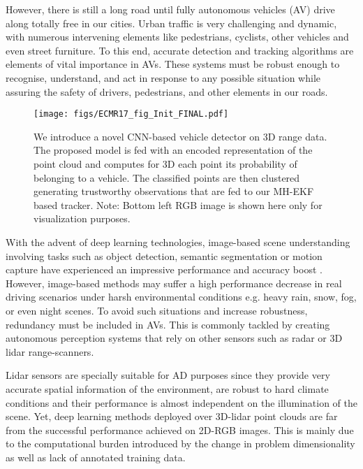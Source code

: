 \documentclass[letterpaper, 10 pt, conference]{ieeeconf}  %
\begin{document}
However, there is still a long road until fully autonomous vehicles (AV) drive along totally free in our cities. 
Urban traffic is very challenging and dynamic, with numerous intervening elements like pedestrians, cyclists, other vehicles and even street furniture. 
To this end, accurate detection and tracking algorithms are elements of vital importance in AVs. These systems must be robust enough to recognise, understand, and act in response to any possible situation while assuring the safety of drivers, pedestrians, and other elements in our roads.

\begin{figure}[t]
\centering
 \centerline{
  	\texttt{[image: figs/ECMR17\_fig\_Init\_FINAL.pdf]}}
  
  \caption{We introduce a novel CNN-based vehicle detector on 3D range data. The proposed model is fed with an encoded representation of the point cloud and computes for 3D each point its probability of belonging to a vehicle. 
  The classified points are then clustered generating trustworthy observations that are fed to our MH-EKF based tracker. Note: Bottom left RGB image is shown here only for visualization purposes.
  \vspace{-3mm}} 
  \label{fig:init}
\end{figure}%
With the advent of deep learning technologies, image-based scene understanding involving tasks such as object detection, semantic segmentation or motion capture have experienced an impressive performance and accuracy boost \cite{krizhevsky2012imagenet, ren2015faster, long2015fully, vvaquero2017flow}. However, image-based methods may suffer a high performance decrease in real driving scenarios under harsh environmental conditions e.g. heavy rain, snow, fog, or even night scenes.
To avoid such situations and increase robustness, redundancy must be included in AVs. This is commonly tackled by creating autonomous perception systems that rely on other sensors such as radar or 3D lidar range-scanners. 

Lidar sensors are specially suitable for AD purposes since they provide very accurate spatial information of the environment, are robust to hard climate conditions and their performance is almost independent on the illumination of the scene. 
%
Yet, deep learning methods deployed over 3D-lidar point clouds are far from the successful performance achieved on 2D-RGB images. This is mainly due to the computational burden introduced by the change in problem dimensionality as well as lack of annotated training data. 
\end{document}
